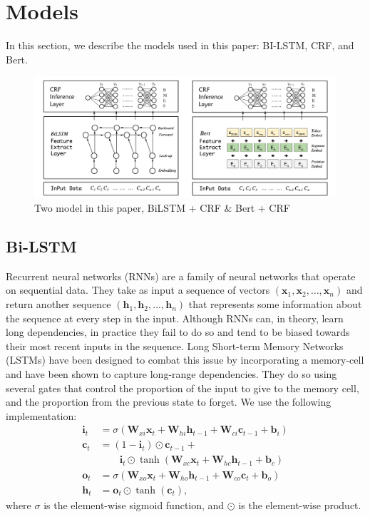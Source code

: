 \section{Models}
In this section, we describe the models used in this paper: BI-LSTM, CRF, and Bert. 
\begin{figure}[t]
    \begin{center}
        \includegraphics[width=\textwidth]{figures/model_struct.pdf}
    \end{center}
    \caption{Two model in this paper, BiLSTM + CRF \& Bert + CRF}
    \label{fig:model}
\end{figure}


\subsection{Bi-LSTM}
\label{sec:lstm}

Recurrent neural networks (RNNs) are a family of neural networks that operate on sequential data. They take as input a sequence of vectors $(\mathbf{x}_1, \mathbf{x}_2, \ldots, \mathbf{x}_n)$ and return another sequence $(\mathbf{h}_1, \mathbf{h}_2, \ldots, \mathbf{h}_n)$ that represents some information about the sequence at every step in the input. Although RNNs can, in theory, learn long dependencies, in practice they fail to do so and tend to be biased towards their most recent inputs in the sequence. Long Short-term Memory Networks (LSTMs) have been designed to combat this issue by incorporating a memory-cell and have been shown to capture long-range dependencies. They do so using several gates that control the proportion of the input to give to the memory cell, and the proportion from the previous state to forget.
We use the following implementation:
\\
\begin{align*}
\mathbf{i}_{t} &= \sigma(\mathbf{W}_{xi}\mathbf{x}_{t} + \mathbf{W}_{hi}\mathbf{h}_{t-1} + \mathbf{W}_{ci}\mathbf{c}_{t-1} + \mathbf{b}_{i})\\
\mathbf{c}_{t} &= (1 - \mathbf{i}_{t})\odot\mathbf{c}_{t-1} +\\
&\qquad \mathbf{i}_{t}\odot \tanh(\mathbf{W}_{xc}\mathbf{x}_{t} + \mathbf{W}_{hc}\mathbf{h}_{t-1} + \mathbf{b}_{c})\\
\mathbf{o}_{t} &= \sigma(\mathbf{W}_{xo}\mathbf{x}_{t} + \mathbf{W}_{ho}\mathbf{h}_{t-1} + \mathbf{W}_{co}\mathbf{c}_{t} + \mathbf{b}_{o})\\
\mathbf{h}_{t} &= \mathbf{o}_{t}\odot\tanh(\mathbf{c}_{t}),
\end{align*}
where $\sigma$ is the element-wise sigmoid function, and $\odot$ is the element-wise product.

